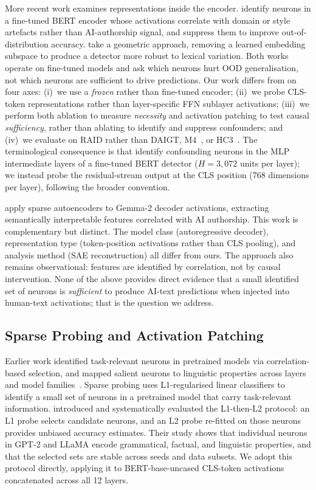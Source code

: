 \documentclass[11pt]{article}
\newcommand{\bertbase}{BERT-base-uncased\xspace}
\begin{document}
More recent work examines representations inside the encoder. \citet{borile2025confounding} identify neurons in a fine-tuned BERT encoder whose activations correlate with domain or style artefacts rather than AI-authorship signal, and suppress them to improve out-of-distribution accuracy. \citet{kuznetsov2024restricted} take a geometric approach, removing a learned embedding subspace to produce a detector more robust to lexical variation. Both works operate on fine-tuned models and ask which neurons hurt OOD generalisation, not which neurons are sufficient to drive predictions. Our work differs from \citet{borile2025confounding} on four axes: (i)~we use a \textit{frozen} rather than fine-tuned encoder; (ii)~we probe CLS-token representations rather than layer-specific FFN sublayer activations; (iii)~we perform both ablation to measure \textit{necessity} and activation patching to test causal \textit{sufficiency}, rather than ablating to identify and suppress confounders; and (iv)~we evaluate on RAID rather than DAIGT, M4~\citep{wang2024m4}, or HC3~\citep{guo2023hc3}. The terminological consequence is that \citet{borile2025confounding} identify confounding neurons in the MLP intermediate layers of a fine-tuned BERT detector ($H = 3{,}072$ units per layer); we instead probe the residual-stream output at the CLS position (768 dimensions per layer), following the broader \citet{sajjad2022survey} convention.

\citet{kuznetsov2025sae} apply sparse autoencoders to Gemma-2 decoder activations, extracting semantically interpretable features correlated with AI authorship. This work is complementary but distinct. The model class (autoregressive decoder), representation type (token-position activations rather than CLS pooling), and analysis method (SAE reconstruction) all differ from ours. The approach also remains observational: features are identified by correlation, not by causal intervention. None of the above provides direct evidence that a small identified set of neurons is \textit{sufficient} to produce AI-text predictions when injected into human-text activations; that is the question we address.

\subsection{Sparse Probing and Activation Patching}

Earlier work identified task-relevant neurons in pretrained models via correlation-based selection, and mapped salient neurons to linguistic properties across layers and model families~\citep{durrani2023salient}. Sparse probing uses L1-regularised linear classifiers to identify a small set of neurons in a pretrained model that carry task-relevant information. \citet{gurnee2023haystack} introduced and systematically evaluated the L1-then-L2 protocol: an L1 probe selects candidate neurons, and an L2 probe re-fitted on those neurons provides unbiased accuracy estimates. Their study shows that individual neurons in GPT-2 and LLaMA encode grammatical, factual, and linguistic properties, and that the selected sets are stable across seeds and data subsets. We adopt this protocol directly, applying it to \bertbase CLS-token activations concatenated across all 12 layers.
\end{document}
